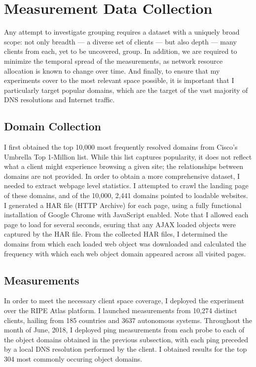 \section{Measurement Data Collection} \label{sky:data}

Any attempt to investigate grouping requires a dataset with a
uniquely broad scope: not only breadth --- a diverse set of clients --- but also depth --- many
clients from each, yet to be uncovered, group. In addition, we are required to minimize the
temporal spread of the measurements, as network resource allocation is known to change over time.
And finally, to ensure that my experiments cover to the most relevant space possible, it is
important that I particularly target popular domains, which are the target of the vast majority
of DNS resolutions and Internet traffic.

\subsection{Domain Collection}

I first obtained the top 10,000 most frequently resolved domains from Cisco's Umbrella Top
1-Million list. While this list captures popularity, it does not reflect what a client might
experience browsing a given site; the relationships between domains are not provided. In order to
obtain a more comprehensive dataset, I needed to extract webpage level statistics. I attempted to
crawl the landing page of these domains, and of the 10,000, 2,441 domains pointed to loadable
websites. I generated a HAR file (HTTP Archive) for each page, using a fully functional
installation of Google Chrome with JavaScript enabled. Note that I allowed each page to load for
several seconds, esuring that any AJAX loaded objects were captured by the HAR file. From the
collected HAR files, I determined the domains from which each loaded web object was downloaded and
calculated the frequency with which each web object domain appeared across all visited pages. 

\subsection{Measurements}

In order to meet the necessary client space coverage, I deployed the
experiment over the RIPE Atlas platform. I launched measurements from 10,274 distinct clients, hailing
from 185 countries and 3637 autonomous systems. Throughout the month of June, 2018, I deployed ping
measurements from each probe to each of the object domains obtained in the previous subsection, with
each ping preceded by a local DNS resolution performed by the client. I obtained results for the
top 304 most commonly occuring object domains. 

